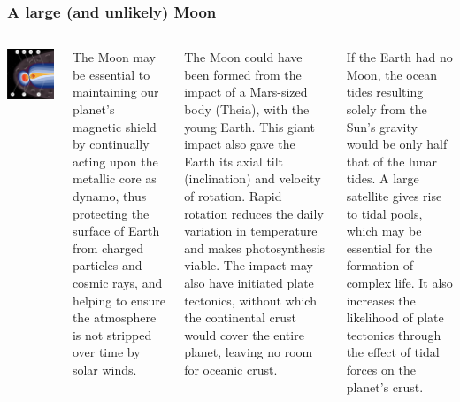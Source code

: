 \begin{frame}
\frametitle{A large (and unlikely) Moon}

\begin{columns}

\includegraphics[scale=0.25]{magnetosphere}

The Moon may be essential to maintaining our planet's magnetic shield by continually acting upon the metallic core as dynamo, thus protecting the surface of Earth from charged particles and cosmic rays, and helping to ensure the atmosphere is not stripped over time by solar winds.

The Moon could have been formed from the impact of a Mars-sized body (Theia), with the young Earth. This giant impact also gave the Earth its axial tilt (inclination) and velocity of rotation. Rapid rotation reduces the daily variation in temperature and makes photosynthesis viable. The impact may also have initiated plate tectonics, without which the continental crust would cover the entire planet, leaving no room for oceanic crust.

If the Earth had no Moon, the ocean tides resulting solely from the Sun's gravity would be only half that of the lunar tides. A large satellite gives rise to tidal pools, which may be essential for the formation of complex life.
It also increases the likelihood of plate tectonics through the effect of tidal forces on the planet's crust.
\end{columns}
\end{frame}

